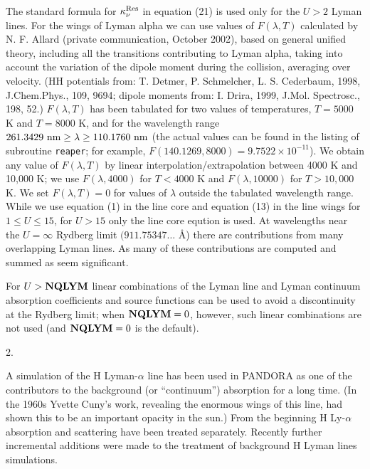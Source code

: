 The standard formula for $\kappa_\nu^{\rm Res}$ in equation (21) is used only
for the $U > 2$ Lyman lines. For the wings of Lyman alpha we can use values of
$F(\lambda,T)$ calculated by N. F. Allard (private communication, October 2002),
based on general unified theory, including all the transitions contributing to
Lyman alpha, taking into account the variation of the dipole moment during the
collision, averaging over velocity. (HH potentials from: T. Detmer, P. Schmelcher,
L. S. Cederbaum, 1998, J.Chem.Phys., 109, 9694; dipole moments from: I. Drira,
1999, J.Mol. \break Spectrosc., 198, 52.) $F(\lambda,T)$ has been tabulated
for two values of temperatures,
$T = 5000$ K and $T = 8000$ K, and for the wavelength range $261.3429\ {\rm nm}
\geq \lambda \geq 110.1760\ {\rm nm}$ (the actual values can be found in the
listing of subroutine {\tt reaper}; for example,
$F(140.1269, 8000) = 9.7522 \times 10^{-11}$).
We obtain any value of $F(\lambda,T)$ by linear
interpolation/extrapolation between 4000 K and 10,000 K; we use
$F(\lambda,4000)$ for $T < 4000$ K and $F(\lambda,10000)$ for $T > 10,000$ K.
We set $F(\lambda,T) = 0$ for values of $\lambda$ outside the tabulated
wavelength range.
\blankline
While we use equation (1) in the line core and equation (13) in the line wings
for $1 \le U \le 15$, for $U > 15$ only the line core eqution is used.
At wavelengths near the $U = \infty$ Rydberg limit $(911.75347 \ldots$ \AA) there
are contributions from many overlapping Lyman lines. As many of these 
contributions are computed and summed as seem significant.

For $U > {\bf NQLYM}$ linear combinations of the Lyman line
and Lyman continuum absorption coefficients and source functions can be used
to avoid a discontinuity at the Rydberg limit; when ${\bf NQLYM} = 0$, however,
such linear combinations are not used (and ${\bf NQLYM} = 0$ is the default).
\ej
\centerline{2. }
\blankline
\blankline
A simulation of the H Lyman-$\alpha$ line has been used in PANDORA as one of
the contributors to the background (or ``continuum'') absorption for a long time.
(In the 1960s Yvette Cuny's work, revealing the enormous wings of this line,
had shown this to be an important opacity in the sun.) From the beginning
H Ly-$\alpha$ absorption and scattering have been treated separately. Recently
further incremental additions were made to the treatment of background H Lyman
lines simulations.

